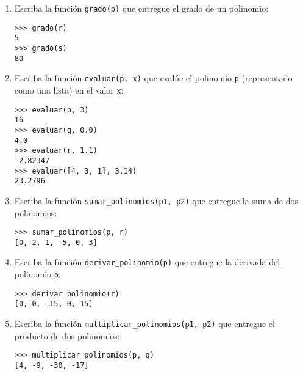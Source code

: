 \begin{enumerate}

  \item
    Escriba la función \lstinline!grado(p)! que entregue el grado de un
    polinomio:
\begin{lstlisting}
>>> grado(r)
5
>>> grado(s)
80
\end{lstlisting}

  \item
    Escriba la función \lstinline!evaluar(p, x)! que evalúe el polinomio
    \lstinline!p! (representado como una lista) en el valor \lstinline!x!:
\begin{lstlisting}
>>> evaluar(p, 3)
16
>>> evaluar(q, 0.0)
4.0
>>> evaluar(r, 1.1)
-2.82347
>>> evaluar([4, 3, 1], 3.14)
23.2796
\end{lstlisting}

  \item
    Escriba la función \lstinline!sumar_polinomios(p1, p2)! que entregue
    la suma de dos polinomios:
\begin{lstlisting}
>>> sumar_polinomios(p, r)
[0, 2, 1, -5, 0, 3]
\end{lstlisting}

  \item
    Escriba la función \lstinline!derivar_polinomio(p)! que entregue la
    derivada del polinomio \lstinline!p!:
\begin{lstlisting}
>>> derivar_polinomio(r)
[0, 0, -15, 0, 15]
\end{lstlisting}

  \item
    Escriba la función \lstinline!multiplicar_polinomios(p1, p2)! que
    entregue el producto de dos polinomios:
\begin{lstlisting}
>>> multiplicar_polinomios(p, q)
[4, -9, -30, -17]
\end{lstlisting}

\end{enumerate}
